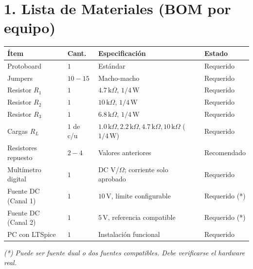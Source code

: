 \documentclass[11pt, a4paper]{article}
\begin{document}
\begin{tcolorbox}[colback=ucbblue!5!white, colframe=ucbblue, title=\textbf{Material del Instructor y BOM: Experiencia Integrada A}]
\end{tcolorbox}

\section*{1. Lista de Materiales (BOM por equipo)}
\renewcommand{\arraystretch}{1.3}
\noindent %
\begin{tabularx}{\textwidth}{|>{\RaggedRight}X|>{\centering\arraybackslash}p{1.5cm}|>{\RaggedRight}X|>{\RaggedRight}X|}
\hline
\rowcolor{ucbblue!10}\textbf{Ítem} & \textbf{Cant.} & \textbf{Especificación} & \textbf{Estado} \\ \hline
Protoboard & $1$ & Estándar & Requerido \\ \hline
Jumpers & $10-15$ & Macho-macho & Requerido \\ \hline
Resistor $R_1$ & $1$ & $4.7\,\text{k}\Omega$, $1/4\,\text{W}$ & Requerido \\ \hline
Resistor $R_2$ & $1$ & $10\,\text{k}\Omega$, $1/4\,\text{W}$ & Requerido \\ \hline
Resistor $R_3$ & $1$ & $6.8\,\text{k}\Omega$, $1/4\,\text{W}$ & Requerido \\ \hline
Cargas $R_L$ & $1$ de c/u & $1.0\,\text{k}\Omega, 2.2\,\text{k}\Omega, 4.7\,\text{k}\Omega, 10\,\text{k}\Omega$ ($1/4\,\text{W}$) & Requerido \\ \hline
Resistores repuesto & $2-4$ & Valores anteriores & Recomendado \\ \hline
Multímetro digital & $1$ & DC V/$\Omega$; corriente solo aprobado & Requerido \\ \hline
Fuente DC (Canal 1) & $1$ & $10\,\text{V}$, límite configurable & Requerido (*) \\ \hline
Fuente DC (Canal 2) & $1$ & $5\,\text{V}$, referencia compatible & Requerido (*) \\ \hline
PC con LTSpice & $1$ & Instalación funcional & Requerido \\ \hline
\end{tabularx}
\textit{(*) Puede ser fuente dual o dos fuentes compatibles. Debe verificarse el hardware real.}
\end{document}
